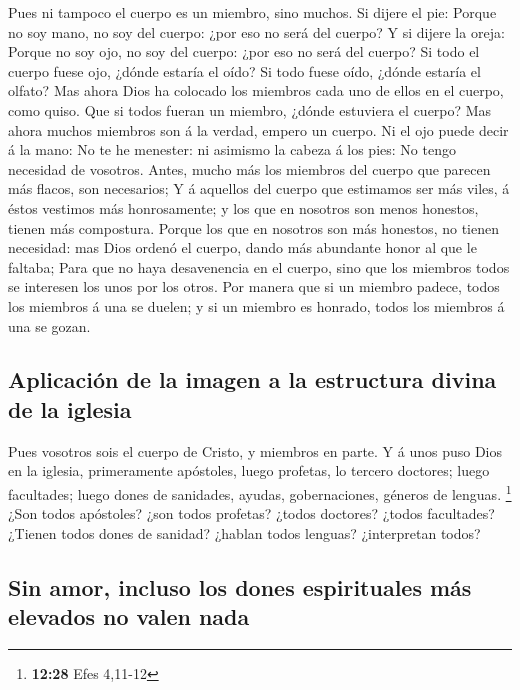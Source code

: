  Pues ni tampoco el cuerpo es un miembro, sino muchos.
 Si dijere el pie: Porque no soy mano, no soy del cuerpo:
¿por eso no será del cuerpo?  Y si dijere la oreja: Porque
no soy ojo, no soy del cuerpo: ¿por eso no será del cuerpo?
 Si todo el cuerpo fuese ojo, ¿dónde estaría el oído? Si
todo fuese oído, ¿dónde estaría el olfato?  Mas ahora Dios
ha colocado los miembros cada uno de ellos en el cuerpo, como quiso.
 Que si todos fueran un miembro, ¿dónde estuviera el
cuerpo?  Mas ahora muchos miembros son á la verdad, empero
un cuerpo.  Ni el ojo puede decir á la mano: No te he
menester: ni asimismo la cabeza á los pies: No tengo necesidad de
vosotros.  Antes, mucho más los miembros del cuerpo que
parecen más flacos, son necesarios;  Y á aquellos del
cuerpo que estimamos ser más viles, á éstos vestimos más honrosamente; y
los que en nosotros son menos honestos, tienen más compostura.
 Porque los que en nosotros son más honestos, no tienen
necesidad: mas Dios ordenó el cuerpo, dando más abundante honor al que
le faltaba;  Para que no haya desavenencia en el cuerpo,
sino que los miembros todos se interesen los unos por los otros.
 Por manera que si un miembro padece, todos los miembros á
una se duelen; y si un miembro es honrado, todos los miembros á una se
gozan.

\hypertarget{aplicaciuxf3n-de-la-imagen-a-la-estructura-divina-de-la-iglesia}{%
\subsection{Aplicación de la imagen a la estructura divina de la
iglesia}\label{aplicaciuxf3n-de-la-imagen-a-la-estructura-divina-de-la-iglesia}}

 Pues vosotros sois el cuerpo de Cristo, y miembros en
parte.  Y á unos puso Dios en la iglesia, primeramente
apóstoles, luego profetas, lo tercero doctores; luego facultades; luego
dones de sanidades, ayudas, gobernaciones, géneros de lenguas.
\footnote{\textbf{12:28} Efes 4,11-12}  ¿Son todos
apóstoles? ¿son todos profetas? ¿todos doctores? ¿todos facultades?
 ¿Tienen todos dones de sanidad? ¿hablan todos lenguas?
¿interpretan todos?

\hypertarget{sin-amor-incluso-los-dones-espirituales-muxe1s-elevados-no-valen-nada}{%
\subsection{Sin amor, incluso los dones espirituales más elevados no
valen
nada}\label{sin-amor-incluso-los-dones-espirituales-muxe1s-elevados-no-valen-nada}}

